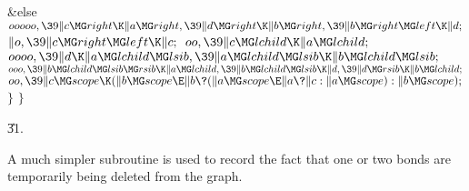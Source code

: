 \&{else}\1\5
${}\\{ooooo},\39\|c\MG\\{right}\K\|a\MG\\{right},\39\|d\MG\\{right}\K\|b\MG%
\\{right},\39\|b\MG\\{right}\MG\\{left}\K\|d;{}$\2\6
${}\|o,\39\|c\MG\\{right}\MG\\{left}\K\|c;{}$\6
${}\\{oo},\39\|c\MG\\{lchild}\K\|a\MG\\{lchild};{}$\6
${}\\{oooo},\39\|d\K\|a\MG\\{lchild}\MG\\{lsib},\39\|a\MG\\{lchild}\MG\\{lsib}%
\K\|b\MG\\{lchild}\MG\\{lsib};{}$\6
${}\\{ooo},\39\|b\MG\\{lchild}\MG\\{lsib}\MG\\{rsib}\K\|a\MG\\{lchild},\39\|b%
\MG\\{lchild}\MG\\{lsib}\K\|d,\39\|d\MG\\{rsib}\K\|b\MG\\{lchild};{}$\6
${}\\{oo},\39\|c\MG\\{scope}\K(\|b\MG\\{scope}\E\|b\?(\|a\MG\\{scope}\E\|a\?%
\|c:\|a\MG\\{scope}):\|b\MG\\{scope});{}$\6
\4${}\}{}$\2\6
\4${}\}{}$\2\par
\U31.\fi

A much simpler subroutine is used to record the fact that one or
two bonds are temporarily being deleted from the graph.

